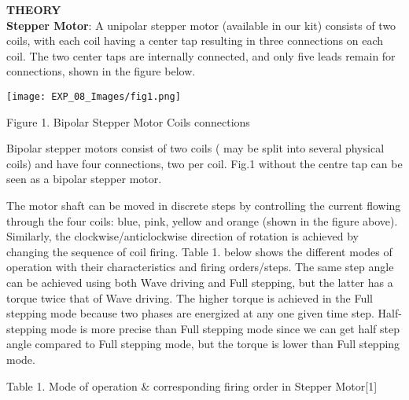 \documentclass[12pt,a4paper]{article}
\begin{document}
\begin{justify}
\textbf{\large THEORY}\\[3pt]
\textbf{Stepper Motor}: A unipolar stepper motor (available in our kit) consists of two coils, with each coil having a center tap resulting in three connections on each coil. The two center taps are internally connected, and only five leads remain for connections, shown in the figure below.

\begin{center} 
\texttt{[image: EXP\_08\_Images/fig1.png]}
\end{center}

\begin{center} {Figure 1. Bipolar Stepper Motor Coils
connections}\end{center}
Bipolar stepper motors consist of two coils ( may be split into several physical coils) and have four connections, two per coil. Fig.1 without the centre tap can be seen as a bipolar stepper motor.\par 
\noindent The motor shaft can be moved in discrete steps by controlling the current flowing through the four 
coils: blue, pink, yellow and orange (shown in the figure above). Similarly, the clockwise/anticlockwise direction of rotation is achieved by changing the sequence of coil firing.
Table 1. below shows the different modes of operation with their characteristics and firing orders/steps. 
The same step angle can be achieved using both Wave driving and Full stepping, but the latter has a 
torque twice that of Wave driving. The higher torque is achieved in the Full stepping mode because 
two phases are energized at any one given time step. Half-stepping mode is more precise than Full 
stepping mode since we can get half step angle compared to Full stepping mode, but the torque is lower 
than Full stepping mode.

\begin{center} {Table 1. Mode of operation \& corresponding firing order in Stepper Motor[1]}\end{center}


\end{justify}
\end{document}
